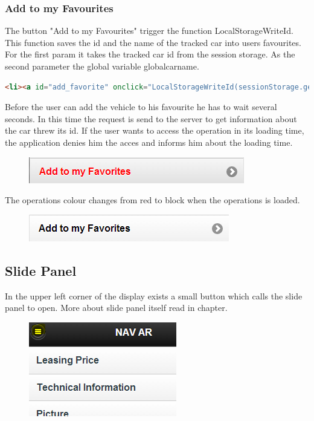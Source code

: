 \subsubsection{Add to my Favourites}
The button "Add to my Favourites" trigger the function LocalStorageWriteId. This function saves the id and the name of the tracked car into users favourites. For the first param it takes the tracked car id from the session storage. As the second parameter the global variable globalcarname.
\\
\begin{lstlisting}[language=html, caption= 
start timer function,captionpos=b]
<li><a id="add_favorite" onclick="LocalStorageWriteId(sessionStorage.getItem('id'),globalcarname);" style="color:red" rel="external" >Add to my Favorites</a></li>
\end{lstlisting}
Before the user can add the vehicle to his favourite he has to wait several seconds. In this time the request is send to the server to get information about the car threw its id. If the user wants to access the operation in its loading time, the application denies him the acces and informs him about the loading time.
\\
\begin{figure}[H]
\centering
\includegraphics[width=0.6\linewidth]{graphics/chapter4/11}
\caption{}
\label{fig:12}
\end{figure}

The operations colour changes from red to block when the operations is loaded.
\\
\begin{figure}[H]
\centering
\includegraphics[width=0.6\linewidth]{graphics/chapter4/12}
\caption{}
\label{fig:13}
\end{figure}


\subsection{Slide Panel}
In the upper left corner of the display exists a small button which calls the slide panel to open. More about slide panel itself read in chapter.
\\
\begin{figure}[H]
\centering
\includegraphics[width=0.4\linewidth]{graphics/chapter4/13}
\caption{}
\label{fig:14}
\end{figure}

